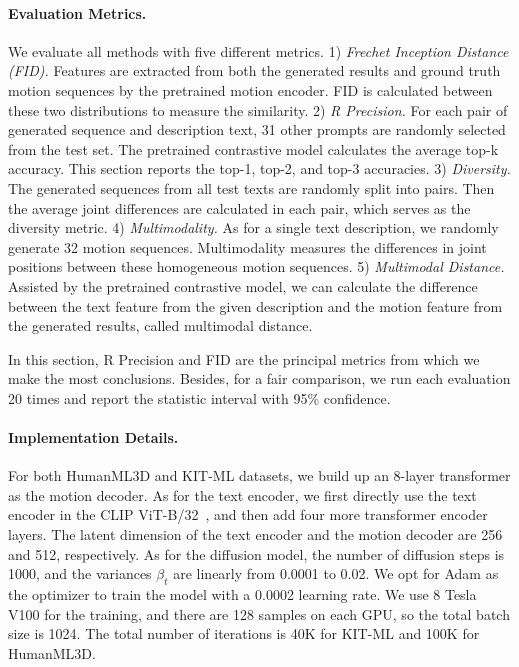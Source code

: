 \paragraph{Evaluation Metrics.}\label{sec4_1_2}
We evaluate all methods with five different metrics. 
1) \textit{Frechet Inception Distance (FID).} Features are extracted from both the generated results and ground truth motion sequences by the pretrained motion encoder. FID is calculated between these two distributions to measure the similarity. 
2) \textit{R Precision.} For each pair of generated sequence and description text, 31 other prompts are randomly selected from the test set. The pretrained contrastive model calculates the average top-k accuracy. This section reports the top-1, top-2, and top-3 accuracies.
3) \textit{Diversity.} The generated sequences from all test texts are randomly split into pairs. Then the average joint differences are calculated in each pair, which serves as the diversity metric.
4) \textit{Multimodality.} As for a single text description, we randomly generate 32 motion sequences. Multimodality measures the differences in joint positions between these homogeneous motion sequences.
5) \textit{Multimodal Distance.} Assisted by the pretrained contrastive model, we can calculate the difference between the text feature from the given description and the motion feature from the generated results, called multimodal distance. 


In this section, R Precision and FID are the principal metrics from which we make the most conclusions. Besides, for a fair comparison, we run each evaluation 20 times and report the statistic interval with 95\% confidence.


\paragraph{Implementation Details.}\label{sec4_1_3}
For both HumanML3D and KIT-ML datasets, we build up an 8-layer transformer as the motion decoder. As for the text encoder, we first directly use the text encoder in the CLIP ViT-B/32~\citep{radford2021learning}, and then add four more transformer encoder layers. The latent dimension of the text encoder and the motion decoder are 256 and 512, respectively. As for the diffusion model, the number of diffusion steps is 1000, and the variances $\beta_t$ are linearly from 0.0001 to 0.02. We opt for Adam as the optimizer to train the model with a 0.0002 learning rate. We use 8 Tesla V100 for the training, and there are 128 samples on each GPU, so the total batch size is 1024. The total number of iterations is 40K for KIT-ML and 100K for HumanML3D.


